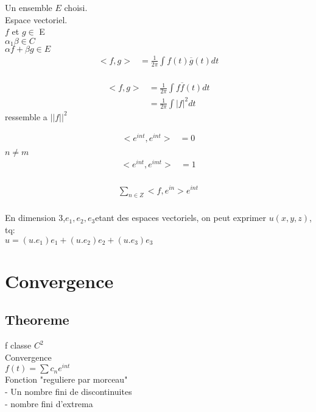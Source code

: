 \documentclass[a4paper,11pt]{article}
\begin{document}
Un ensemble $E$ choisi.\\
Espace vectoriel.\\
$f$ et $g \in $ E\\
$\alpha_1 \beta \in C$\\
$\alpha f + \beta g \in E$\\

\begin{align*}
  <f,g> &= \frac{1}{2\pi} \int f(t) \overline{g}(t) dt\\
\end{align*}

\begin{align*}
<f,g> &= \frac{1}{2\pi} \int f\overline{f}(t) dt\\
      &= \frac{1}{2\pi} \int |f|^2 dt
\end{align*}
ressemble a $||f||^2$

\begin{align*}
  <e^{int},e^{int} > &= 0\\
\end{align*}
 $n \neq m$\\
 \begin{align*}
   <e^{int},e^{imt}> &= 1\\
 \end{align*}
 
 \begin{align*}
\sum_{n \in Z} < f,e^{in}> e^{int}\\   
 \end{align*}

En dimension 3,$ e_1, e_2, e_3 $etant des espaces vectoriels, on peut exprimer $u(x,y,z)$, tq:\\
$u = (u.e_1)e_1 + (u.e_2)e_2 + (u.e_3)e_3$\\

\section{Convergence}

\subsection{Theoreme}
f  classe $C^2$\\
Convergence\\
$f(t) = \sum c_n e^{int}$\\

Fonction "reguliere par morceau"\\
- Un nombre fini de discontinuites\\
- nombre fini d'extrema\\
\end{document}
